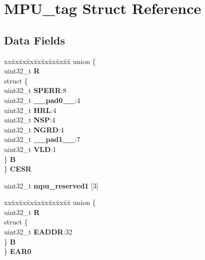 \hypertarget{structMPU__tag}{}\section{M\+P\+U\+\_\+tag Struct Reference}
\label{structMPU__tag}
\subsection*{Data Fields}
\begin{DoxyCompactItemize}
\item 
\mbox{\label{structMPU__tag_a3b0ea85afb5bc69468f0daea3ff71544}} 
\begin{tabbing}
xx\=xx\=xx\=xx\=xx\=xx\=xx\=xx\=xx\=\kill
union \{\\
\>uint32\_t {\bfseries R}\\
\>struct \{\\
\>\>uint32\_t {\bfseries SPERR}:8\\
\>\>uint32\_t {\bfseries \_\_pad0\_\_}:4\\
\>\>uint32\_t {\bfseries HRL}:4\\
\>\>uint32\_t {\bfseries NSP}:4\\
\>\>uint32\_t {\bfseries NGRD}:4\\
\>\>uint32\_t {\bfseries \_\_pad1\_\_}:7\\
\>\>uint32\_t {\bfseries VLD}:1\\
\>\} {\bfseries B}\\
\} {\bfseries CESR}\\

\end{tabbing}\item 
\mbox{\label{structMPU__tag_a92feed24c245345ce45ef40f02f361ea}} 
uint32\+\_\+t {\bfseries mpu\+\_\+reserved1} \mbox{[}3\mbox{]}
\item 
\mbox{\label{structMPU__tag_a32700f30f5d160ef3788fa6a08df27c9}} 
\begin{tabbing}
xx\=xx\=xx\=xx\=xx\=xx\=xx\=xx\=xx\=\kill
union \{\\
\>uint32\_t {\bfseries R}\\
\>struct \{\\
\>\>uint32\_t {\bfseries EADDR}:32\\
\>\} {\bfseries B}\\
\} {\bfseries EAR0}\\


\end{tabbing}
\end{DoxyCompactItemize}
